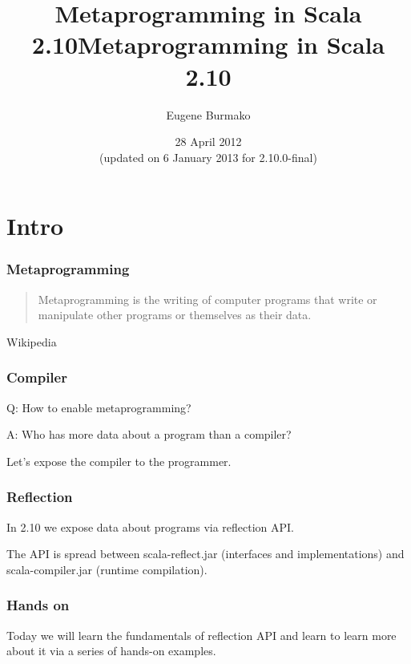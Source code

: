 \documentclass[hyperref={bookmarks=false}]{beamer}
\title{Metaprogramming in Scala 2.10}
\begin{document}
\title{Metaprogramming in Scala 2.10}
\author{Eugene Burmako}
\date{28 April 2012 \\ (updated on 6 January 2013 for 2.10.0-final)}
\maketitle

\section{Intro}

\begin{frame}[fragile]
\frametitle{Metaprogramming}

\begin{quote}
Metaprogramming is the writing of computer programs that write or manipulate other programs or themselves as their data.
\end{quote}

\begin{flushright}
\textemdash Wikipedia
\end{flushright}

\end{frame}

\begin{frame}[fragile]
\frametitle{Compiler}

Q: How to enable metaprogramming?

A: Who has more data about a program than a compiler?

Let's expose the compiler to the programmer.

\end{frame}

\begin{frame}[fragile]
\frametitle{Reflection}

In 2.10 we expose data about programs via reflection API.

The API is spread between scala-reflect.jar (interfaces and implementations) and scala-compiler.jar (runtime compilation).

\end{frame}

\begin{frame}[fragile]
\frametitle{Hands on}

Today we will learn the fundamentals of reflection API and learn to learn more about it
via a series of hands-on examples.

\end{frame}
\end{document}
